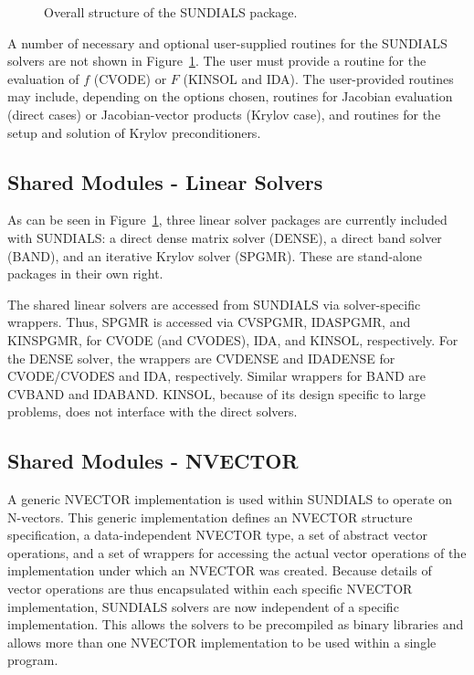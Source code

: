 \begin{figure}[tp]
\centerline{}
\caption{Overall structure of the SUNDIALS  package.}
\label{fig-sunorg}
\end{figure}

A number of necessary and optional user-supplied routines for the SUNDIALS
solvers are not shown in \mbox{Figure \ref{fig-sunorg}}. The user must
provide a routine for the evaluation of $f$ (CVODE) or $F$ (KINSOL and
IDA). The user-provided routines may include, depending on the options
chosen, routines for Jacobian evaluation (direct cases) or Jacobian-vector
products (Krylov case), and routines for the setup and solution of Krylov
preconditioners.


\subsection{Shared Modules - Linear Solvers}

As can be seen in \mbox{Figure \ref{fig-sunorg}}, three linear solver
packages are currently included with SUNDIALS: a direct dense matrix solver
(DENSE), a direct band solver (BAND), and an iterative Krylov solver
(SPGMR). These are stand-alone packages in their own right.

The shared linear solvers are accessed from SUNDIALS via
solver-specific wrappers. 
Thus, SPGMR is accessed via CVSPGMR, IDASPGMR, and
KINSPGMR, for CVODE (and CVODES), IDA, and KINSOL, respectively. For the
DENSE solver, the wrappers are CVDENSE and IDADENSE for CVODE/CVODES and
IDA, respectively. Similar wrappers for BAND are CVBAND and IDABAND. KINSOL,
because of its design specific to large problems, does not interface with
the direct solvers.

\subsection{Shared Modules - NVECTOR}

A generic NVECTOR implementation is used within SUNDIALS to
operate on N-vectors. This generic implementation defines an NVECTOR
structure specification, a data-independent NVECTOR type, a set of abstract
vector operations, and a set of wrappers for accessing the actual vector
operations of the implementation under which an NVECTOR was created. Because
details of vector operations are thus encapsulated within each specific
NVECTOR implementation, SUNDIALS solvers are now independent of a specific
implementation. This allows the solvers to be precompiled as binary
libraries and allows more than one NVECTOR implementation to be used within
a single program.

